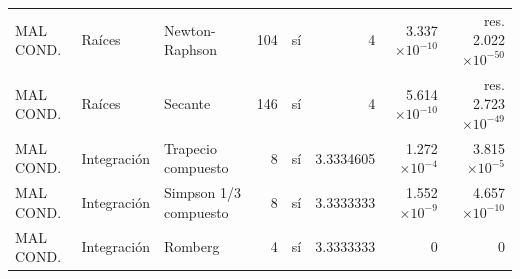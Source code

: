 {\begin{longtable}{lllrlrrr}
MAL COND. & Raíces & Newton-Raphson & 104 & sí & 4 & 3.337$\times10^{-10}$ & res. 2.022$\times10^{-50}$ \\
MAL COND. & Raíces & Secante & 146 & sí & 4 & 5.614$\times10^{-10}$ & res. 2.723$\times10^{-49}$ \\
MAL COND. & Integración & Trapecio compuesto & 8 & sí & 3.3334605 & 1.272$\times10^{-4}$ & 3.815$\times10^{-5}$ \\
MAL COND. & Integración & Simpson 1/3 compuesto & 8 & sí & 3.3333333 & 1.552$\times10^{-9}$ & 4.657$\times10^{-10}$ \\
MAL COND. & Integración & Romberg & 4 & sí & 3.3333333 & 0 & 0 \\
\bottomrule
\end{longtable}
}
